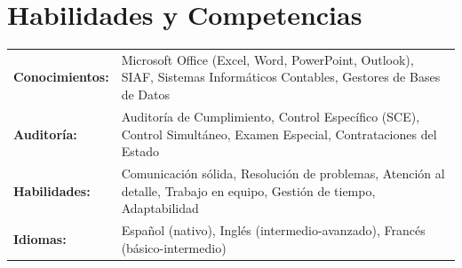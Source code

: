 \documentclass[10pt,letterpaper]{article}
\begin{document}
\section{Habilidades y Competencias}

\begin{tabularx}{\textwidth}{@{}l X@{}}
\textbf{Conocimientos:} & Microsoft Office (Excel, Word, PowerPoint, Outlook), SIAF, Sistemas Informáticos Contables, Gestores de Bases de Datos \\
\textbf{Auditoría:} & Auditoría de Cumplimiento, Control Específico (SCE), Control Simultáneo, Examen Especial, Contrataciones del Estado \\
\textbf{Habilidades:} & Comunicación sólida, Resolución de problemas, Atención al detalle, Trabajo en equipo, Gestión de tiempo, Adaptabilidad \\
\textbf{Idiomas:} & Español (nativo), Inglés (intermedio-avanzado), Francés (básico-intermedio) \\
\end{tabularx}
\end{document}
